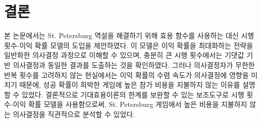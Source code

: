 \chapter{결론}

본 논문에서는 St. Petersburg 역설을 해결하기 위해 효용 함수를 사용하는 대신 시행 횟수-이익 확률 모델의 도입을 제안하였다. 이 모델은 이익 확률을 최대화하는 전략을 일반화한 의사결정 과정으로 이해할 수 있으며, 충분히 큰 시행 횟수에서는 기댓값 기반 의사결정과 동일한 결과를 도출하는 것을 확인하였다. 그러나 의사결정자가 무한한 반복 횟수를 고려하지 않는 현실에서는 이익 확률의 수렴 속도가 의사결정에 영향을 미치기 때문에, 성공 확률이 희박한 게임에 높은 참가 비용을 지불하지 않는 이유를 설명할 수 있었다. 결론적으로 기대효용이론의 한계를 보완할 수 있는 보조도구로 시행 횟수-이익 확률 모델을 사용함으로써, St. Petersburg 게임에서 높은 비용을 지불하지 않는 의사결정을 직관적으로 분석할 수 있었다.
